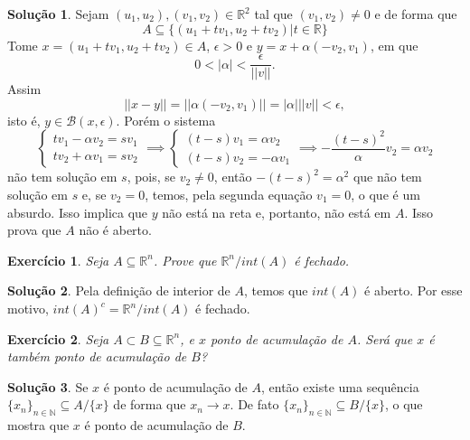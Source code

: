 \documentclass[a4paper,12pt]{article}
\newcommand{\R}{\mathbb{R}}
\newcommand{\B}{\mathcal{B}}
\theoremstyle{exer}
\newtheorem{exercise}{Exercício}
\theoremstyle{definition}
\newtheorem{solution}{Solução}
\theoremstyle{plain}
\begin{document}
\begin{solution}
    Sejam $(u_1, u_2), (v_1, v_2) \in \R^2$ tal que $(v_1, v_2) \neq 0$ e de forma que 
    $$A \subseteq \{(u_1 + tv_1, u_2 + tv_2) | t \in \R\}$$
    Tome $x = (u_1 + tv_1, u_2 + tv_2) \in A$, $\epsilon > 0$ e $y =
    x + \alpha(-v_2,v_1)$, em que 
    $$0 < |\alpha| < \frac{\epsilon}{||v||}.$$ Assim  
    $$
    ||x - y|| = ||\alpha(-v_2, v_1)|| = |\alpha|||v|| < \epsilon,
    $$
    isto é, $y \in \B(x, \epsilon)$. Porém o sistema 
    $$
    \begin{cases}
        t v_1 - \alpha v_2 = s v_1  \\
        t v_2 + \alpha v_1 = s v_2
    \end{cases} \implies
    \begin{cases}
        (t - s)v_1 = \alpha v_2 \\
        (t - s)v_2 = -\alpha v_1
    \end{cases} \implies 
    -\frac{(t - s)^2}{\alpha}v_2 = \alpha
    v_2
    $$
    não tem solução em $s$, pois, se $v_2 \neq
    0$, então $-(t-s)^2 = \alpha^2$ que não tem solução em $s$ e, se $v_2 = 0$, temos,
    pela segunda equação $v_1 = 0$, o que é um absurdo. Isso implica que $y$
    não está na reta e, portanto, não está em $A$. Isso prova que $A$ não é
    aberto. 
\end{solution}

\begin{exercise}
    Seja $A \subseteq \R^n$. Prove que $\R^n/int(A)$ é fechado.
\end{exercise}

\begin{solution}
    Pela definição de interior de $A$, temos que $int(A)$ é aberto. Por esse
    motivo, $int(A)^c = \R^n / int(A)$ é fechado. 
\end{solution}

\begin{exercise}
    Seja $A \subset B \subseteq \R^n$, e $x$ ponto de acumulação de $A$. Será que $x$ é também ponto de
    acumulação de $B$?
\end{exercise}

\begin{solution}
    Se $x$ é ponto de acumulação de $A$, então existe uma sequência
    $\{x_n\}_{n \in \mathbb{N}} \subseteq A / \{x\}$ de forma que $x_n \to x$.
    De fato $\{x_n\}_{n \in \mathbb{N}} \subseteq B / \{x\}$, o que mostra que
    $x$ é ponto de acumulação de $B$. 
\end{solution}
\end{document}
